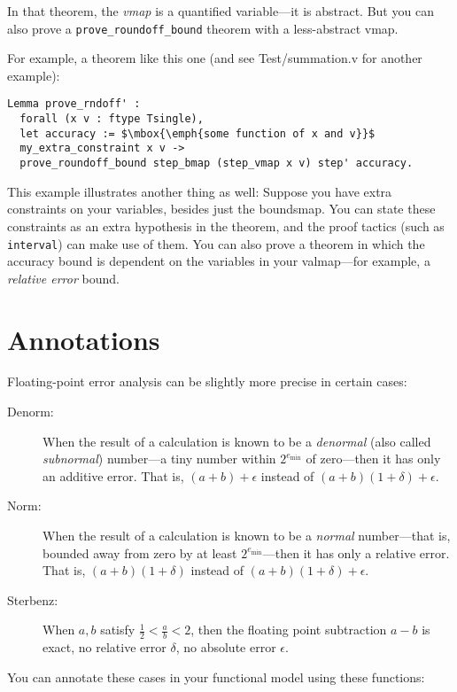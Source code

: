 \documentclass[article]{memoir}
\begin{document}
In that theorem, the \emph{vmap} is a quantified variable---it is
abstract.  But you can also prove a \lstinline{prove_roundoff_bound}
theorem with a less-abstract vmap.

For example, a theorem like this one (and see Test/summation.v
for another example):
\begin{lstlisting}
Lemma prove_rndoff' :
  forall (x v : ftype Tsingle),
  let accuracy := $\mbox{\emph{some function of x and v}}$
  my_extra_constraint x v ->   
  prove_roundoff_bound step_bmap (step_vmap x v) step' accuracy.
\end{lstlisting}  

This example illustrates another thing as well:  Suppose you have
extra constraints on your variables, besides just the boundsmap.
You can state these constraints as an extra hypothesis
in the theorem, and the proof tactics (such as \lstinline{interval}) can
make use of them.  You can also prove a theorem in which the
accuracy bound is dependent on the variables in your valmap---for example,
a \emph{relative error} bound.

\chapter{Annotations}

Floating-point error analysis can be slightly more precise
in certain cases:

\begin{description}
\item[Denorm:]  When the result of a calculation is known to be a
  \emph{denormal} (also called \emph{subnormal}) number---a tiny
  number within $2^{e_\mathrm{min}}$ of zero---then it has only
  an additive error.  That is, $(a+b)+\epsilon$ instead of
  $(a+b)(1+\delta)+\epsilon$.
\item[Norm:]
   When the result of a calculation is known to be a
   \emph{normal} number---that is, bounded away from zero by
   at least $2^{e_\mathrm{min}}$---then it has only
  a relative error.  That is, $(a+b)(1+\delta)$ instead of
  $(a+b)(1+\delta)+\epsilon$.
\item[Sterbenz:]  When $a,b$ satisfy $\frac{1}{2} < \frac{a}{b} < 2$,
  then the floating point subtraction $a-b$ is exact, no relative
  error $\delta$, no absolute error $\epsilon$.
\end{description}

You can annotate these cases in your functional model using these functions:
\end{document}

